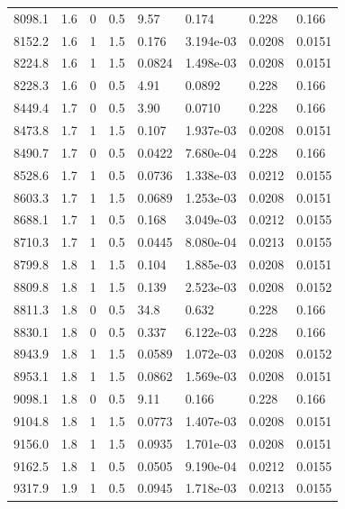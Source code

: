 \documentclass[preview]{standalone}
\begin{document}
{{{\begin{tabular}{L{1.2cm}C{1.2cm} C{0.3cm}C{0.5cm} C{1.4cm}C{1.4cm} C{1.4cm}C{1.4cm}}
  8098.1  &   1.6  & 0     & 0.5 &  9.57  & 0.174  & 0.228 &  0.166   \\ 
  8152.2  &   1.6  & 1     & 1.5 &  0.176  & 3.194e-03  & 0.0208 &  0.0151   \\ 
  8224.8  &   1.6  & 1     & 1.5 &  0.0824  & 1.498e-03  & 0.0208 &  0.0151   \\ 
  8228.3  &   1.6  & 0     & 0.5 &  4.91  & 0.0892  & 0.228 &  0.166   \\ 
  8449.4  &   1.7  & 0     & 0.5 &  3.90  & 0.0710  & 0.228 &  0.166   \\ 
  8473.8  &   1.7  & 1     & 1.5 &  0.107  & 1.937e-03  & 0.0208 &  0.0151   \\ 
  8490.7  &   1.7  & 0     & 0.5 &  0.0422  & 7.680e-04  & 0.228 &  0.166   \\ 
  8528.6  &   1.7  & 1     & 0.5 &  0.0736  & 1.338e-03  & 0.0212 &  0.0155   \\ 
  8603.3  &   1.7  & 1     & 1.5 &  0.0689  & 1.253e-03  & 0.0208 &  0.0151   \\ 
  8688.1  &   1.7  & 1     & 0.5 &  0.168  & 3.049e-03  & 0.0212 &  0.0155   \\ 
  8710.3  &   1.7  & 1     & 0.5 &  0.0445  & 8.080e-04  & 0.0213 &  0.0155   \\ 
  8799.8  &   1.8  & 1     & 1.5 &  0.104  & 1.885e-03  & 0.0208 &  0.0151   \\ 
  8809.8  &   1.8  & 1     & 1.5 &  0.139  & 2.523e-03  & 0.0208 &  0.0152   \\ 
  8811.3  &   1.8  & 0     & 0.5 &  34.8  & 0.632  & 0.228 &  0.166   \\ 
  8830.1  &   1.8  & 0     & 0.5 &  0.337  & 6.122e-03  & 0.228 &  0.166   \\ 
  8943.9  &   1.8  & 1     & 1.5 &  0.0589  & 1.072e-03  & 0.0208 &  0.0152   \\ 
  8953.1  &   1.8  & 1     & 1.5 &  0.0862  & 1.569e-03  & 0.0208 &  0.0151   \\ 
  9098.1  &   1.8  & 0     & 0.5 &  9.11  & 0.166  & 0.228 &  0.166   \\ 
  9104.8  &   1.8  & 1     & 1.5 &  0.0773  & 1.407e-03  & 0.0208 &  0.0151   \\ 
  9156.0  &   1.8  & 1     & 1.5 &  0.0935  & 1.701e-03  & 0.0208 &  0.0151   \\ 
  9162.5  &   1.8  & 1     & 0.5 &  0.0505  & 9.190e-04  & 0.0212 &  0.0155   \\ 
  9317.9  &   1.9  & 1     & 0.5 &  0.0945  & 1.718e-03  & 0.0213 &  0.0155   \\ 

\end{tabular}}}}
\end{document}

